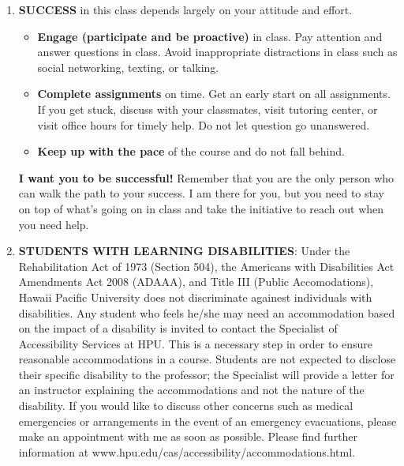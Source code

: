 \documentclass[12pt]{amsart}
\begin{document}
\begin {enumerate}
\begin {enumerate}
\item {\bf SUCCESS} in this class depends largely on your attitude and effort.
\begin{itemize}
\item {\bf Engage (participate and be proactive)} in class. Pay attention and answer questions in class. Avoid inappropriate distractions in class such as social networking, texting, or talking.
\item {\bf Complete assignments} on time. Get an early start on all assignments. If you get stuck, discuss with your classmates, visit tutoring center, or visit office hours for timely help. Do not let question go unanswered.
\item {\bf Keep up with the pace} of the course and do not fall behind.\\
\end{itemize}
{\bf I want you to be successful!} Remember that you are the only person who can walk the path to your success. I am there for you, but you need to stay on top of what's going on in class and take the initiative to reach out when you need help.\\
\item {\bf STUDENTS WITH LEARNING DISABILITIES}: Under the Rehabilitation Act of 1973 (Section 504), the Americans with Disabilities Act Amendments Act 2008 (ADAAA), and Title III (Public Accomodations), Hawaii Pacific University does not discriminate againest individuals with disabilities. Any student who feels he/she may need an accommodation based on the impact of a disability is invited to contact the Specialist of Accessibility Services at HPU. This is a necessary step in order to ensure reasonable accommodations in a course. Students are not expected to disclose their specific disability to the professor; the Specialist will provide a letter for an instructor explaining the accommodations and not the nature of the disability. If you would like to discuss other concerns such as medical emergencies or arrangements in the event of an emergency evacuations, please make an appointment with me as soon as possible. Please find further information at www.hpu.edu/cas/accessibility/accommodations.html. \\



\end{enumerate}



\end{enumerate}
\end{document}
